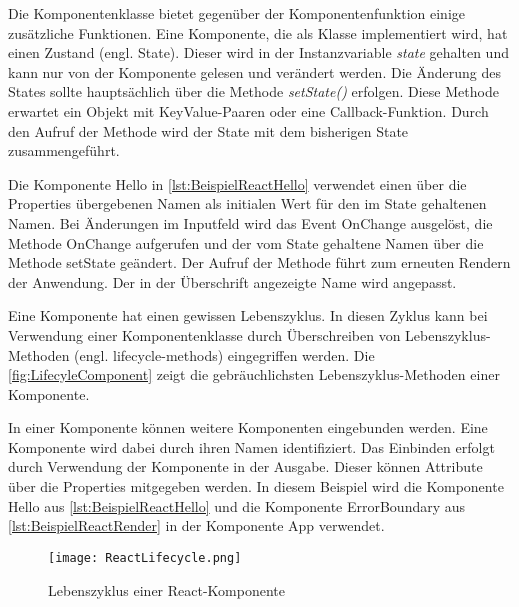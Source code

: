 Die Komponentenklasse bietet gegenüber der Komponentenfunktion einige zusätzliche Funktionen. Eine  Komponente, die als Klasse implementiert wird, hat einen Zustand (engl. State). Dieser wird in der Instanzvariable \textit{state} gehalten und kann nur von der Komponente gelesen und verändert werden. Die Änderung des States sollte hauptsächlich über die Methode \textit{setState()} erfolgen. Diese Methode  erwartet ein Objekt mit KeyValue-Paaren oder eine Callback-Funktion. Durch den Aufruf der Methode wird der State mit dem bisherigen State zusammengeführt.\autocites[vgl.][24\psq,89-93]{Zeigermann.2016}[vgl.][17\psq]{Stefanov.2017} 

Die Komponente Hello in \autoref{lst:BeispielReactHello} verwendet einen über die Properties übergebenen Namen als initialen Wert für den im State gehaltenen Namen. Bei Änderungen im Inputfeld wird das Event OnChange ausgelöst, die Methode OnChange aufgerufen und der vom State gehaltene Namen über die Methode setState geändert. Der Aufruf der Methode führt zum erneuten Rendern der Anwendung. Der in der Überschrift angezeigte Name wird angepasst.

Eine Komponente hat einen gewissen Lebenszyklus. In diesen Zyklus kann bei Verwendung einer Komponentenklasse durch Überschreiben von Lebenszyklus-Methoden (engl. lifecycle-methods) eingegriffen werden. Die \autoref{fig:LifecyleComponent} zeigt die gebräuchlichsten Lebenszyklus-Methoden einer Komponente.\autocites[vgl.][96-100]{Zeigermann.2016}[vgl.][]{Facebook.2018b}

In einer Komponente können weitere Komponenten eingebunden werden. Eine Komponente wird dabei durch ihren Namen identifiziert. Das Einbinden erfolgt durch Verwendung der Komponente in der Ausgabe. Dieser können Attribute über die Properties mitgegeben werden.\autocites[vgl.][111\psqq]{Zeigermann.2016} In diesem Beispiel wird die Komponente Hello aus \autoref{lst:BeispielReactHello}  und die Komponente ErrorBoundary aus \autoref{lst:BeispielReactRender} in der Komponente App verwendet. 


\begin{figure}
	\centering
	\texttt{[image: ReactLifecycle.png]}
	\caption{Lebenszyklus einer  React-Komponente} 
	\label{fig:LifecyleComponent}
\end{figure}



